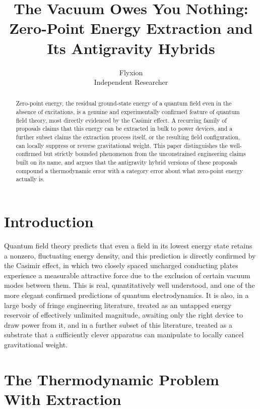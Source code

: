 \documentclass[11pt]{article}
\title{The Vacuum Owes You Nothing: Zero-Point Energy Extraction and Its Antigravity Hybrids}
\author{Flyxion \\ \small Independent Researcher}
\date{}
\begin{document}
\maketitle

\begin{abstract}
Zero-point energy, the residual ground-state energy of a quantum field even in the absence of excitations, is a genuine and experimentally confirmed feature of quantum field theory, most directly evidenced by the Casimir effect. A recurring family of proposals claims that this energy can be extracted in bulk to power devices, and a further subset claims the extraction process itself, or the resulting field configuration, can locally suppress or reverse gravitational weight. This paper distinguishes the well-confirmed but strictly bounded phenomenon from the unconstrained engineering claims built on its name, and argues that the antigravity hybrid versions of these proposals compound a thermodynamic error with a category error about what zero-point energy actually is.
\end{abstract}

\section{Introduction}

Quantum field theory predicts that even a field in its lowest energy state retains a nonzero, fluctuating energy density, and this prediction is directly confirmed by the Casimir effect, in which two closely spaced uncharged conducting plates experience a measurable attractive force due to the exclusion of certain vacuum modes between them. This is real, quantitatively well understood, and one of the more elegant confirmed predictions of quantum electrodynamics. It is also, in a large body of fringe engineering literature, treated as an untapped energy reservoir of effectively unlimited magnitude, awaiting only the right device to draw power from it, and in a further subset of this literature, treated as a substrate that a sufficiently clever apparatus can manipulate to locally cancel gravitational weight.

\section{The Thermodynamic Problem With Extraction}
\end{document}
